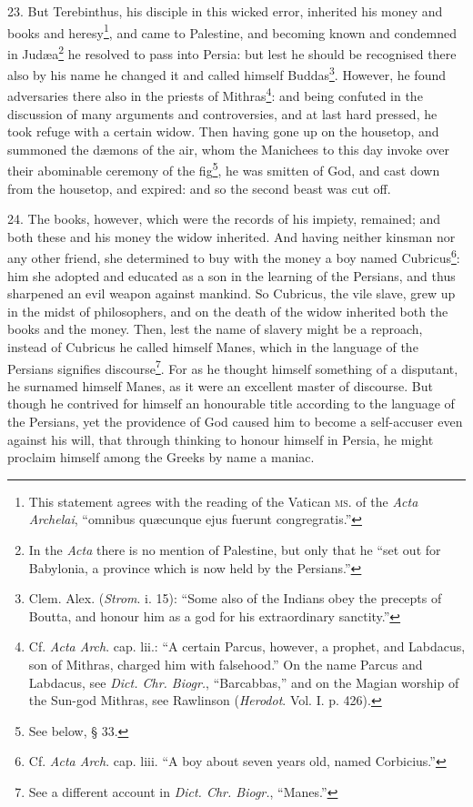 23. But Terebinthus, his disciple in this wicked error, inherited his money and books and heresy\footnote{This statement agrees with the reading of the Vatican \textsc{ms.} of the \emph{Acta Archelai}, “omnibus quæcunque ejus fuerunt congregratis.”}, and came to Palestine, and becoming known and condemned in Judæa\footnote{In the \emph{Acta} there is no mention of Palestine, but only that he “set out for Babylonia, a province which is now held by the Persians.”} he resolved to pass into Persia: but lest he should be recognised there also by his name he changed it and called himself Buddas\footnote{Clem. Alex. (\emph{Strom}. i. 15): “Some also of the Indians obey the precepts of Boutta, and honour him as a god for his extraordinary sanctity.”}. However, he found adversaries there also in the priests of Mithras\footnote{Cf. \emph{Acta Arch}. cap. lii.: “A certain Parcus, however, a prophet, and Labdacus, son of Mithras, charged him with falsehood.” On the name Parcus and Labdacus, see \emph{Dict. Chr. Biogr.}, “Barcabbas,” and on the Magian worship of the Sun-god Mithras, see Rawlinson (\emph{Herodot}. Vol. I. p. 426).}: and being confuted in the discussion of many arguments and controversies, and at last hard pressed, he took refuge with a certain widow. Then having gone up on the housetop, and summoned the dæmons of the air, whom the Manichees to this day invoke over their abominable ceremony of the fig\footnote{See below, § 33.}, he was smitten of God, and cast down from the housetop, and expired: and so the second beast was cut off.

24. The books, however, which were the records of his impiety, remained; and both these and his money the widow inherited. And having neither kinsman nor any other friend, she determined to buy with the money a boy named Cubricus\footnote{Cf. \emph{Acta Arch}. cap. liii. “A boy about seven years old, named Corbicius.”}: him she adopted and educated as a son in the learning of the Persians, and thus sharpened an evil weapon against mankind. So Cubricus, the vile slave, grew up in the midst of philosophers, and on the death of the widow inherited both the books and the money. Then, lest the name of slavery might be a reproach, instead of Cubricus he called himself Manes, which in the language of the Persians signifies discourse\footnote{See a different account in \emph{Dict. Chr. Biogr.}, “Manes.”}. For as he thought himself something of a disputant, he surnamed himself Manes, as it were an excellent master of discourse. But though he contrived for himself an honourable title according to the language of the Persians, yet the providence of God caused him to become a self-accuser even against his will, that through thinking to honour himself in Persia, he might proclaim himself among the Greeks by name a maniac.

